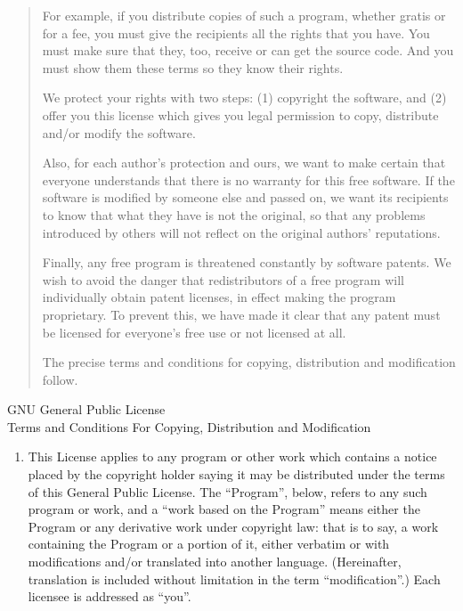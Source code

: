 \documentclass{book}
\begin{document}
{\begin{center}
\begin{quote}
For example, if you distribute copies of such a program, whether gratis or
for a fee, you must give the recipients all the rights that you have.  You
must make sure that they, too, receive or can get the source code.  And
you must show them these terms so they know their rights.

We protect your rights with two steps: (1) copyright the software, and (2)
offer you this license which gives you legal permission to copy,
distribute and/or modify the software.

Also, for each author's protection and ours, we want to make certain that
everyone understands that there is no warranty for this free software.  If
the software is modified by someone else and passed on, we want its
recipients to know that what they have is not the original, so that any
problems introduced by others will not reflect on the original authors'
reputations.

Finally, any free program is threatened constantly by software patents.
We wish to avoid the danger that redistributors of a free program will
individually obtain patent licenses, in effect making the program
proprietary.  To prevent this, we have made it clear that any patent must
be licensed for everyone's free use or not licensed at all.

The precise terms and conditions for copying, distribution and
modification follow.
\end{quote}
\end{center}



\begin{center}
{\Large \sc GNU General Public License
\\\vspace{3mm}Terms and Conditions For Copying, Distribution and Modification}
\end{center}


\begin{enumerate}

\addtocounter{enumi}{-1}

\item 

This License applies to any program or other work which contains a notice
placed by the copyright holder saying it may be distributed under the
terms of this General Public License.  The ``Program'', below, refers to
any such program or work, and a ``work based on the Program'' means either
the Program or any derivative work under copyright law: that is to say, a
work containing the Program or a portion of it, either verbatim or with
modifications and/or translated into another language.  (Hereinafter,
translation is included without limitation in the term ``modification''.)
Each licensee is addressed as ``you''.


\end{enumerate}}
\end{document}
